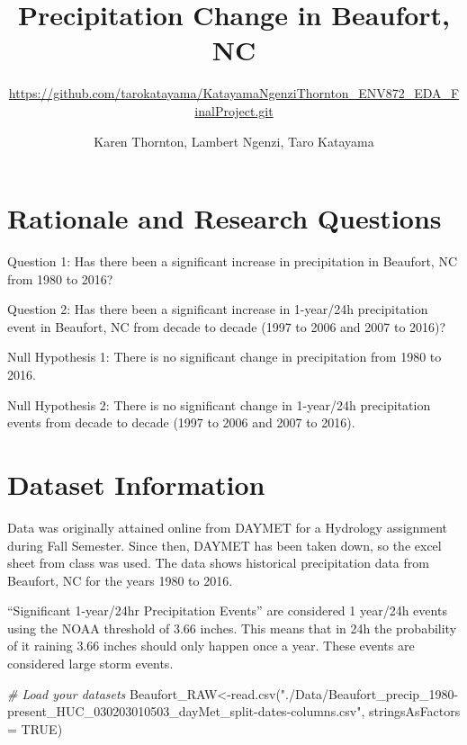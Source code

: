 \documentclass[
  12pt,
]{article}
\title{Precipitation Change in Beaufort, NC}
\subtitle{\url{https://github.com/tarokatayama/KatayamaNgenziThornton_ENV872_EDA_FinalProject.git}}
\author{Karen Thornton, Lambert Ngenzi, Taro Katayama}
\date{}
\newenvironment{Shaded}{\begin{snugshade}}{\end{snugshade}}
\newcommand{\AttributeTok}[1]{\textcolor[rgb]{0.77,0.63,0.00}{#1}}
\newcommand{\CommentTok}[1]{\textcolor[rgb]{0.56,0.35,0.01}{\textit{#1}}}
\newcommand{\ConstantTok}[1]{\textcolor[rgb]{0.00,0.00,0.00}{#1}}
\newcommand{\FunctionTok}[1]{\textcolor[rgb]{0.00,0.00,0.00}{#1}}
\newcommand{\NormalTok}[1]{#1}
\newcommand{\OtherTok}[1]{\textcolor[rgb]{0.56,0.35,0.01}{#1}}
\newcommand{\StringTok}[1]{\textcolor[rgb]{0.31,0.60,0.02}{#1}}
\begin{document}
\maketitle

\newpage
\tableofcontents
\newpage
\DataWrangling
\newpage
\listoffigures 
\newpage

\hypertarget{rationale-and-research-questions}{%
\section{Rationale and Research
Questions}\label{rationale-and-research-questions}}

Question 1: Has there been a significant increase in precipitation in
Beaufort, NC from 1980 to 2016?

Question 2: Has there been a significant increase in 1-year/24h
precipitation event in Beaufort, NC from decade to decade (1997 to 2006
and 2007 to 2016)?

Null Hypothesis 1: There is no significant change in precipitation from
1980 to 2016.

Null Hypothesis 2: There is no significant change in 1-year/24h
precipitation events from decade to decade (1997 to 2006 and 2007 to
2016).

\newpage

\hypertarget{dataset-information}{%
\section{Dataset Information}\label{dataset-information}}

Data was originally attained online from DAYMET for a Hydrology
assignment during Fall Semester. Since then, DAYMET has been taken down,
so the excel sheet from class was used. The data shows historical
precipitation data from Beaufort, NC for the years 1980 to 2016.

``Significant 1-year/24hr Precipitation Events'' are considered 1
year/24h events using the NOAA threshold of 3.66 inches. This means that
in 24h the probability of it raining 3.66 inches should only happen once
a year. These events are considered large storm events.

\begin{Shaded}
\begin{Highlighting}[]
\CommentTok{\# Load your datasets}
\NormalTok{Beaufort\_RAW}\OtherTok{\textless{}{-}}\FunctionTok{read.csv}\NormalTok{(}\StringTok{"./Data/Beaufort\_precip\_1980{-}present\_HUC\_030203010503\_dayMet\_split{-}dates{-}columns.csv"}\NormalTok{, }\AttributeTok{stringsAsFactors =} \ConstantTok{TRUE}\NormalTok{)}
\end{Highlighting}
\end{Shaded}
\end{document}
